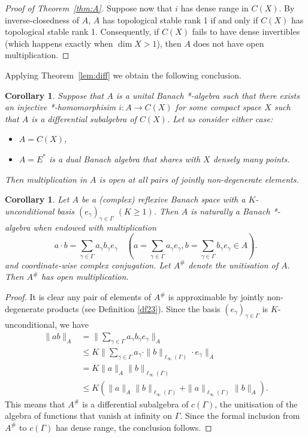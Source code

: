 \documentclass[12pt,fleqn]{amsart}
\newtheorem{corollary}[theorem]{Corollary}
\theoremstyle{definition}
\numberwithin{equation}{section}
\theoremstyle{remark}
\begin{document}
\begin{proof}[Proof of Theorem~\ref{thm:A}]
Suppose now that $i$ has dense range in $C(X)$. By inverse-closedness of $A$, $A$ has topological stable rank 1 if and only if $C(X)$ has topological stable rank 1. Consequently, if $C(X)$ fails to have dense invertibles (which happens exactly when $\dim X > 1$), then $A$ does not have open multiplication. 
\end{proof}

Applying Theorem~\ref{lem:diff} we obtain the following conclusion.

\begin{corollary}
        Suppose that $A$ is a unital Banach *-algebra such that there exists an injective *-homomorphisim $i\colon A\to C(X)$ for some compact space $X$ such that $A$ is a differential subalgebra of $C(X)$. Let us consider either case:
    \begin{itemize}
        \item $A = C(X)$, 
        \item $A = E^*$ is a dual Banach algebra that shares with $X$ densely many points.
    \end{itemize}
    Then multiplication in $A$ is open at all pairs of jointly non-degenerate elements. 
\end{corollary}
\begin{corollary} 
    Let $A$ be a (complex) reflexive Banach space with a $K$-unconditional basis $(e_\gamma)_{\gamma\in \Gamma}$ $(K\geqslant 1)$. Then $A$ is naturally a Banach *- algebra when endowed with multiplication 
    \[
        a \cdot b = \sum_{\gamma\in \Gamma} a_\gamma b_\gamma e_\gamma \quad (a = \sum_{\gamma\in \Gamma} a_\gamma e_\gamma, b = \sum_{\gamma\in \Gamma} b_\gamma e_\gamma\in A).
    \]
    and coordinate-wise complex conjugation. Let $A^\#$ denote the unitisation of $A$. Then $A^\#$ has open multiplication. 
\end{corollary}
\begin{proof} It is clear any pair of elements of $A^\#$ is approximable by jointly non-degenerate products (see Definition \ref{df23}). Since the basis $(e_\gamma)_{\gamma\in \Gamma}$ is $K$-unconditional, we have
%
    \begin{equation*}
    \begin{split}
        \|ab\|_A &=
        \bigg\| \sum_{\gamma\in \Gamma}  a_\gamma b_\gamma e_\gamma \bigg\|_A \\
        &\leqslant K \bigg\|\sum_{\gamma\in \Gamma}  a_\gamma \cdot \|b\|_{\ell_\infty(\Gamma)} \cdot e_\gamma \bigg\|_A \\
        &=K\|a\|_A \|b\|_{\ell_\infty(\Gamma)}\\
        &\leqslant K(\|a\|_A \|b\|_{\ell_\infty(\Gamma)}+\|a\|_{\ell_\infty(\Gamma)}\|b\|_A).
    \end{split}
    \end{equation*}
%
This means that $A^\#$ is a differential subalgebra of $c(\Gamma)$, the unitisation of the algebra of functions that vanish at infinity on $\Gamma$. Since the formal inclusion from $A^\#$ to $c(\Gamma)$ has dense range, the conclusion follows.
\end{proof}
\end{document}
